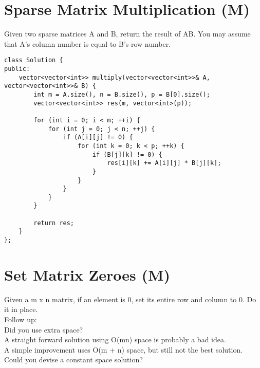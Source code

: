 \section{Sparse Matrix Multiplication (M)}
Given two sparse matrices A and B, return the result of AB. You may assume that A's column number is equal to B's row number.\\

\begin{lstlisting}
class Solution {
public:
    vector<vector<int>> multiply(vector<vector<int>>& A, vector<vector<int>>& B) {
        int m = A.size(), n = B.size(), p = B[0].size();
        vector<vector<int>> res(m, vector<int>(p));
        
        for (int i = 0; i < m; ++i) {
            for (int j = 0; j < n; ++j) {
                if (A[i][j] != 0) {
                    for (int k = 0; k < p; ++k) {
                        if (B[j][k] != 0) {
                            res[i][k] += A[i][j] * B[j][k]; 
                        }
                    }
                }
            }
        }
        
        return res;
    }
};
\end{lstlisting}


\section{Set Matrix Zeroes (M)}
Given a m x n matrix, if an element is 0, set its entire row and column to 0. Do it in place.\\

Follow up:\\
Did you use extra space?\\
A straight forward solution using O(mn) space is probably a bad idea.\\
A simple improvement uses O(m + n) space, but still not the best solution.\\
Could you devise a constant space solution?\\

